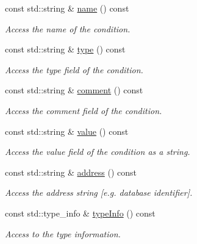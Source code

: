 \begin{DoxyCompactItemize}
const std::string \& \hyperlink{class_d_d4hep_1_1_conditions_1_1_condition_ab4b94316f4df66998b750336ab14dc90}{name} () const 
\begin{DoxyCompactList}\small\item\em Access the name of the condition. \item\end{DoxyCompactList}\item 
const std::string \& \hyperlink{class_d_d4hep_1_1_conditions_1_1_condition_ad9e7b6937816fe75a440802f835de6bc}{type} () const 
\begin{DoxyCompactList}\small\item\em Access the type field of the condition. \item\end{DoxyCompactList}\item 
const std::string \& \hyperlink{class_d_d4hep_1_1_conditions_1_1_condition_aba1cf327a9df8f9e694cebc1c3505d4e}{comment} () const 
\begin{DoxyCompactList}\small\item\em Access the comment field of the condition. \item\end{DoxyCompactList}\item 
const std::string \& \hyperlink{class_d_d4hep_1_1_conditions_1_1_condition_a2380234fddc3c50888eaf57ae60948f0}{value} () const 
\begin{DoxyCompactList}\small\item\em Access the value field of the condition as a string. \item\end{DoxyCompactList}\item 
const std::string \& \hyperlink{class_d_d4hep_1_1_conditions_1_1_condition_a7bbc628e25bc0f887743ce52f56b07cb}{address} () const 
\begin{DoxyCompactList}\small\item\em Access the address string \mbox{[}e.g. database identifier\mbox{]}. \item\end{DoxyCompactList}\item 
const std::type\_\-info \& \hyperlink{class_d_d4hep_1_1_conditions_1_1_condition_a4000e74dc8e5830d56f01b5dad0951ff}{typeInfo} () const 
\begin{DoxyCompactList}\small\item\em Access to the type information. \item\end{DoxyCompactList}\item 

\end{DoxyCompactItemize}

